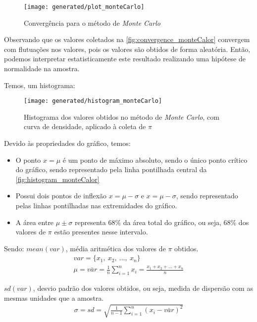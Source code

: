 \begin{figure}[H]
   \centering
   \caption{Convergência para o método de \textit{Monte Carlo}}
   \texttt{[image: generated/plot\_monteCarlo]}
   \label{fig:convergence_monteCalor}
\end{figure}%

Observando que os valores coletados na \autoref{fig:convergence_monteCalor} convergem com flutuações nos valores, pois os valores são obtidos de forma aleatória. Então, podemos interpretar estatisticamente este resultado realizando uma hipótese de normalidade na amostra.
 
Temos, um histograma:

\begin{figure}[H]
   \centering
   \caption{Histograma dos valores obtidos no método de \textit{Monte Carlo}, com curva de densidade, aplicado à coleta de $\pi$}
   \texttt{[image: generated/histogram\_monteCarlo]}
   \label{fig:histogram_monteCalor}
\end{figure}%

Devido às propriedades do gráfico, temos:
\begin{itemize}
   \item O ponto $x = \mu$ é um ponto de máximo absoluto, sendo o único ponto crítico do gráfico, sendo representado pela linha pontilhada central da \autoref{fig:histogram_monteCalor}
   \item Possui dois pontos de inflexão $x = \mu - \sigma$ e $x = \mu - \sigma$, sendo representado pelas linhas pontilhadas nas extremidades do gráfico.
   \item A área entre $\mu \pm \sigma$ representa $68\%$ da área total do gráfico, ou seja, $68\%$ dos valores de $\pi$ estão presentes nesse intervalo.
\end{itemize}
Sendo:
$mean(var)$, média aritmética dos valores de $\pi$ obtidos.
\begin{gather*}
   var = \{x_{1},\ x_{2},\ \dots,\ x_{n}\} \\
   \mu = \bar{var} = \frac{1}{n} \sum_{i=1}^{n} x_{i} = \frac{x_{1} + x_{2} + \dots + x_{n}}{n}
\end{gather*}

$sd(var)$, desvio padrão dos valores obtidos, ou seja, medida de dispersão com as mesmas unidades que a amostra.
\begin{gather*}
   \sigma = sd = \sqrt{\frac{1}{n-1}\sum_{i=1}^{n}\left(x_{i}-\bar{var}\right)^{2}}
\end{gather*}

